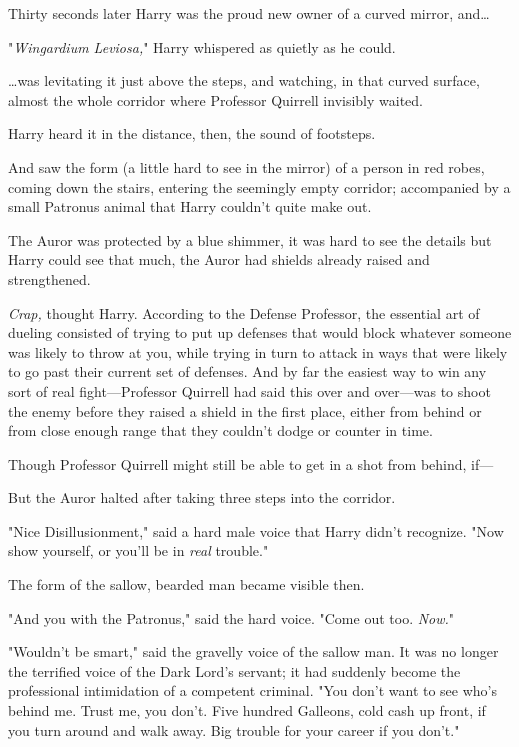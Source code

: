 Thirty seconds later Harry was the proud new owner of a curved mirror, 
and{\ldots}

"\emph{Wingardium Leviosa,}" Harry whispered as quietly as he could.

{\ldots}was levitating it just above the steps, and watching, in that curved 
surface, almost the whole corridor where Professor Quirrell invisibly waited.

Harry heard it in the distance, then, the sound of footsteps.

And saw the form (a little hard to see in the mirror) of a person in red robes, 
coming down the stairs, entering the seemingly empty corridor; accompanied by a 
small Patronus animal that Harry couldn't quite make out.

The Auror was protected by a blue shimmer, it was hard to see the details but 
Harry could see that much, the Auror had shields already raised and 
strengthened.

\emph{Crap,} thought Harry. According to the Defense Professor, the essential 
art of dueling consisted of trying to put up defenses that would block whatever 
someone was likely to throw at you, while trying in turn to attack in ways that 
were likely to go past their current set of defenses. And by far the easiest 
way to win any sort of real fight---Professor Quirrell had said this over and 
over---was to shoot the enemy before they raised a shield in the first place, 
either from behind or from close enough range that they couldn't dodge or 
counter in time.

Though Professor Quirrell might still be able to get in a shot from behind, 
if---

But the Auror halted after taking three steps into the corridor.

"Nice Disillusionment," said a hard male voice that Harry didn't recognize. 
"Now show yourself, or you'll be in \emph{real} trouble."

The form of the sallow, bearded man became visible then.

"And you with the Patronus," said the hard voice. "Come out too. \emph{Now.}"

"Wouldn't be smart," said the gravelly voice of the sallow man. It was no 
longer the terrified voice of the Dark Lord's servant; it had suddenly become 
the professional intimidation of a competent criminal. "You don't want to see 
who's behind me. Trust me, you don't. Five hundred Galleons, cold cash up 
front, if you turn around and walk away. Big trouble for your career if you 
don't."


